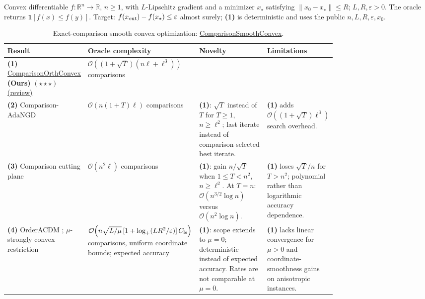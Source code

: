 \begin{table}[tp]
\centering
\caption{Exact-comparison smooth convex optimization: \href{https://github.com/k3nfalt/longtails/blob/main/LongTails/Setups/ComparisonSmoothConvex.lean}{ComparisonSmoothConvex}.}\label{tab:ComparisonSmoothConvex}
\parbox{\linewidth}{\footnotesize Convex differentiable $f:\mathbb{R}^n\to\mathbb{R}$, $n\ge1$, with $L$-Lipschitz gradient and a minimizer $x_\star$ satisfying $\|x_0-x_\star\|\le R$; $L,R,\varepsilon>0$. The oracle returns $\mathbf{1}[f(x)\le f(y)]$. Target: $f(x_{\rm out})-f(x_\star)\le\varepsilon$ almost surely; \textbf{(1)} is deterministic and uses the public $n,L,R,\varepsilon,x_0$.}\par\smallskip
\begin{threeparttable}
\footnotesize
\setlength{\tabcolsep}{4pt}\renewcommand{\arraystretch}{1.25}
\begin{tabularx}{\linewidth}{@{}>{\raggedright\arraybackslash}p{0.20\linewidth}>{\raggedright\arraybackslash}p{0.32\linewidth}>{\raggedright\arraybackslash}p{0.25\linewidth}>{\raggedright\arraybackslash}X@{}}
\toprule
\textbf{Result} & \textbf{Oracle complexity} & \textbf{Novelty} & \textbf{Limitations} \\
\midrule
\textbf{(1)} \href{https://github.com/k3nfalt/longtails/blob/main/LongTails/Theorems/ComparisonOrthConvex.lean}{Comparison\allowbreak Orth\allowbreak Convex} \textbf{(Ours)} $(\star\star\star)$ \href{https://github.com/k3nfalt/longtails/blob/main/scripts/reviews/ComparisonOrthConvex.md}{(review)} & $\mathcal{O}((1+\sqrt T)(n\ell+\ell^3))$ comparisons & & \\
\midrule[1.2pt]
\textbf{(2)} Comparison-AdaNGD \citep[Thm.~2]{csZhangLi2024v1} & $\mathcal{O}(n(1+T)\ell)$ comparisons & \textbf{(1)}: $\sqrt T$ instead of $T$ for $T\ge1$, $n\ge\ell^2$; last iterate instead of comparison-selected best iterate. & \textbf{(1)} adds $\mathcal{O}((1+\sqrt T)\ell^3)$ search overhead. \\
\midrule
\textbf{(3)} Comparison cutting plane \citep[Thm.~3]{csZhangLi2024v1} & $\mathcal{O}(n^2\ell)$ comparisons & \textbf{(1)}: gain $n/\sqrt T$ when $1\le T<n^2$, $n\ge\ell^2$. At $T=n$: $\mathcal{O}(n^{3/2}\log n)$ versus $\mathcal{O}(n^2\log n)$. & \textbf{(1)} loses $\sqrt T/n$ for $T>n^2$; polynomial rather than logarithmic accuracy dependence. \\
\midrule
\textbf{(4)} OrderACDM \citep[Thm.~4.1]{csLobanov2024v3}; $\mu$-strongly convex restriction & $\mathcal{O}\!\left(n\sqrt{L/\mu}\,[1+\log_+(LR^2/\varepsilon)]\,C_{\rm ls}\right)$ comparisons, uniform coordinate bounds; expected accuracy & \textbf{(1)}: scope extends to $\mu=0$; deterministic instead of expected accuracy. Rates are not comparable at $\mu=0$. & \textbf{(1)} lacks linear convergence for $\mu>0$ and coordinate-smoothness gains on anisotropic instances. \\

\end{tabularx}
\end{threeparttable}
\end{table}
